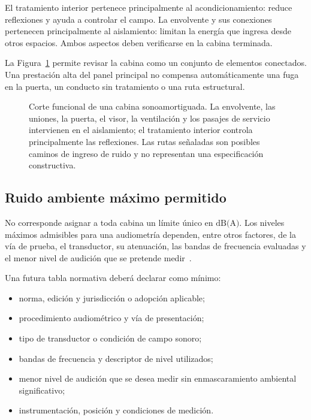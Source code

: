 El tratamiento interior pertenece principalmente al acondicionamiento: reduce
reflexiones y ayuda a controlar el campo. La envolvente y sus conexiones
pertenecen principalmente al aislamiento: limitan la energía que ingresa desde
otros espacios. Ambos aspectos deben verificarse en la cabina terminada.

La Figura~\ref{fig:u9-cabina-sistema} permite revisar la cabina como un
conjunto de elementos conectados. Una prestación alta del panel principal no
compensa automáticamente una fuga en la puerta, un conducto sin tratamiento
o una ruta estructural.

\begin{figure}[htbp]
    \centering
    
    \caption{Corte funcional de una cabina sonoamortiguada. La envolvente,
    las uniones, la puerta, el visor, la ventilación y los pasajes de servicio
    intervienen en el aislamiento; el tratamiento interior controla
    principalmente las reflexiones. Las rutas señaladas son posibles caminos
    de ingreso de ruido y no representan una especificación constructiva.}
    \label{fig:u9-cabina-sistema}
\end{figure}

\subsection{Ruido ambiente máximo permitido}
\label{sec:u9-ruido-cabina}

No corresponde asignar a toda cabina un límite único en
\(\text{dB(A)}\). Los niveles máximos admisibles para una audiometría
dependen, entre otros factores, de la vía de prueba, el transductor, su
atenuación, las bandas de frecuencia evaluadas y el menor nivel de audición
que se pretende medir~\cite{iso8253_1_2010,ansiS31_2023,iso8253_2_2009}.

Una futura tabla normativa deberá declarar como mínimo:

\begin{itemize}
    \item norma, edición y jurisdicción o adopción aplicable;
    \item procedimiento audiométrico y vía de presentación;
    \item tipo de transductor o condición de campo sonoro;
    \item bandas de frecuencia y descriptor de nivel utilizados;
    \item menor nivel de audición que se desea medir sin enmascaramiento
    ambiental significativo;
    \item instrumentación, posición y condiciones de medición.
\end{itemize}

